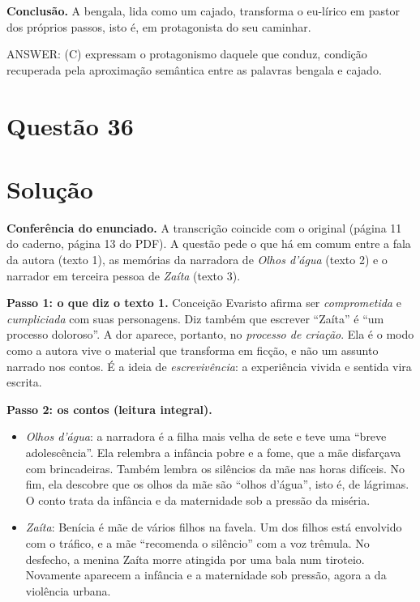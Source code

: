 \documentclass{article}%
\begin{document}
\textbf{Conclusão.} A bengala, lida como um cajado, transforma o eu-lírico em pastor dos próprios passos, isto é, em protagonista do seu caminhar.

ANSWER: (C) expressam o protagonismo daquele que conduz, condição recuperada pela aproximação semântica entre as palavras bengala e cajado.%
\newpage%
\section*{Questão 36}

\section*{Solução}

\textbf{Conferência do enunciado.} A transcrição coincide com o original (página 11 do caderno, página 13 do PDF). A questão pede o que há em comum entre a fala da autora (texto 1), as memórias da narradora de \textit{Olhos d'água} (texto 2) e o narrador em terceira pessoa de \textit{Zaíta} (texto 3).

\textbf{Passo 1: o que diz o texto 1.} Conceição Evaristo afirma ser \emph{comprometida} e \emph{cumpliciada} com suas personagens. Diz também que escrever ``Zaíta'' é ``um processo doloroso''. A dor aparece, portanto, no \emph{processo de criação}. Ela é o modo como a autora vive o material que transforma em ficção, e não um assunto narrado nos contos. É a ideia de \emph{escrevivência}: a experiência vivida e sentida vira escrita.

\textbf{Passo 2: os contos (leitura integral).}
\begin{itemize}
\item \textit{Olhos d'água}: a narradora é a filha mais velha de sete e teve uma ``breve adolescência''. Ela relembra a infância pobre e a fome, que a mãe disfarçava com brincadeiras. Também lembra os silêncios da mãe nas horas difíceis. No fim, ela descobre que os olhos da mãe são ``olhos d'água'', isto é, de lágrimas. O conto trata da infância e da maternidade sob a pressão da miséria.
\item \textit{Zaíta}: Benícia é mãe de vários filhos na favela. Um dos filhos está envolvido com o tráfico, e a mãe ``recomenda o silêncio'' com a voz trêmula. No desfecho, a menina Zaíta morre atingida por uma bala num tiroteio. Novamente aparecem a infância e a maternidade sob pressão, agora a da violência urbana.
\end{itemize}
\end{document}
